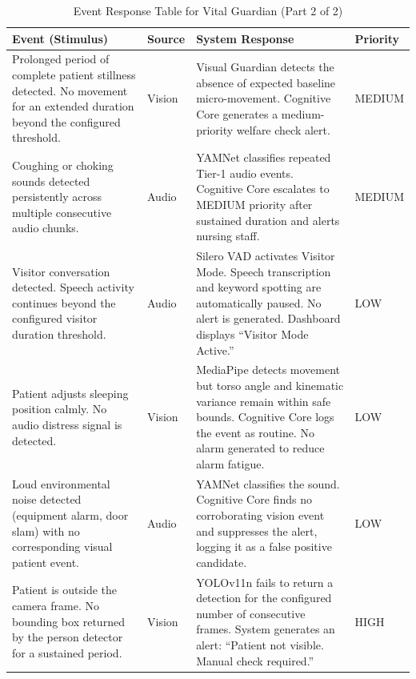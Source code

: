 \begin{table}[H]
    \centering
    \caption{Event Response Table for Vital Guardian (Part 2 of 2)}
    \label{tab:event_response_2}
    \renewcommand{\arraystretch}{1.4}
    \begin{tabular}{|p{3.8cm}|p{2cm}|p{5.2cm}|p{1.8cm}|}
    \hline
    \textbf{Event (Stimulus)} & \textbf{Source} & \textbf{System Response} & \textbf{Priority} \\ \hline

    Prolonged period of complete patient stillness detected. No movement for
    an extended duration beyond the configured threshold. &
    Vision &
    Visual Guardian detects the absence of expected baseline micro-movement.
    Cognitive Core generates a medium-priority welfare check alert. &
    MEDIUM \\ \hline

    Coughing or choking sounds detected persistently across multiple consecutive
    audio chunks. &
    Audio &
    YAMNet classifies repeated Tier-1 audio events. Cognitive Core escalates
    to MEDIUM priority after sustained duration and alerts nursing staff. &
    MEDIUM \\ \hline

    Visitor conversation detected. Speech activity continues beyond the
    configured visitor duration threshold. &
    Audio &
    Silero VAD activates Visitor Mode. Speech transcription and keyword
    spotting are automatically paused. No alert is generated. Dashboard
    displays ``Visitor Mode Active.'' &
    LOW \\ \hline

    Patient adjusts sleeping position calmly. No audio distress signal
    is detected. &
    Vision &
    MediaPipe detects movement but torso angle and kinematic variance remain
    within safe bounds. Cognitive Core logs the event as routine. No alarm
    generated to reduce alarm fatigue. &
    LOW \\ \hline

    Loud environmental noise detected (equipment alarm, door slam) with no
    corresponding visual patient event. &
    Audio &
    YAMNet classifies the sound. Cognitive Core finds no corroborating vision
    event and suppresses the alert, logging it as a false positive candidate. &
    LOW \\ \hline

    Patient is outside the camera frame. No bounding box returned by the
    person detector for a sustained period. &
    Vision &
    YOLOv11n fails to return a detection for the configured number of
    consecutive frames. System generates an alert: ``Patient not visible.
    Manual check required.'' &
    HIGH \\ \hline

    \end{tabular}
\end{table}


